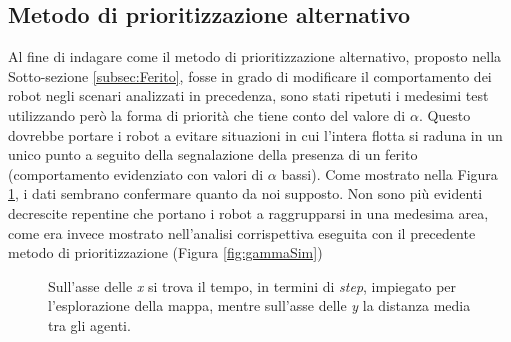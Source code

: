 \subsection{Metodo di prioritizzazione alternativo}
Al fine di indagare come il metodo di prioritizzazione alternativo, proposto nella Sotto-sezione \ref{subsec:Ferito}, fosse in grado di modificare il comportamento dei robot negli scenari analizzati in precedenza, sono stati ripetuti i medesimi test utilizzando però la forma di priorità che tiene conto del valore di $\alpha$. Questo dovrebbe portare i robot a evitare situazioni in cui l'intera flotta si raduna in un unico punto a seguito della segnalazione della presenza di un ferito (comportamento evidenziato con valori di $\alpha$ bassi).
Come mostrato nella Figura \ref{fig:NgammaLDistr}, i dati sembrano confermare quanto da noi supposto. Non sono più evidenti decrescite repentine che portano i robot a raggrupparsi in una medesima area, come era invece mostrato nell'analisi corrispettiva eseguita con il precedente metodo di prioritizzazione (Figura \ref{fig:gammaSim})
\begin{figure}
	\hfill
	\caption{Sull'asse delle \textit{x} si trova il tempo, in termini di \textit{step}, impiegato per l'esplorazione della mappa, mentre sull'asse delle \textit{y} la distanza media tra gli agenti.}
	\label{fig:NgammaLDistr}
\end{figure}
